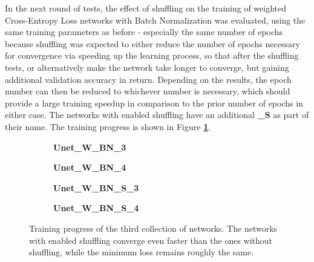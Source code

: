 In the next round of tests, the effect of shuffling on the training of weighted Cross-Entropy Loss networks with Batch Normalization was evaluated, using the same training parameters as before - especially the same number of epochs because shuffling was expected to either reduce the number of epochs necessary for convergence via speeding up the learning process, so that after the shuffling tests, or alternatively make the network take longer to converge, but gaining additional validation accuracy in return. Depending on the results, the epoch number can then be reduced to whichever number is necessary, which should provide a large training speedup in comparison to the prior number of epochs in either case. The networks with enabled shuffling have an additional \textbf{\_S} as part of their name. The training progress is shown in Figure \textbf{\ref{fig:weighted_batchnorm_shuffle_training}}.

\begin {figure}[!htb]
	\begin {subfigure}[b]{0.4\linewidth}
		\scalebox{0.65}{}
		\caption{\textbf{Unet\_W\_BN\_3}}
	\end {subfigure}\hspace{1.75cm}
	\begin {subfigure}[b]{0.4\linewidth}
		\scalebox{0.65}{}
		\caption{\textbf{Unet\_W\_BN\_4}}
	\end {subfigure}

	\begin {subfigure}[b]{0.4\linewidth}
		\scalebox{0.65}{}
		\caption{\textbf{Unet\_W\_BN\_S\_3}}
	\end {subfigure}\hspace{1.75cm}
	\begin {subfigure}[b]{0.4\linewidth}
		\scalebox{0.65}{}
		\caption{\textbf{Unet\_W\_BN\_S\_4}}
	\end {subfigure}

		\caption[Training progress of the third collection of networks.]{Training progress of the third collection of networks. The networks with enabled shuffling converge even faster than the ones without shuffling, while the minimum loss remains roughly the same.}
		\label{fig:weighted_batchnorm_shuffle_training}
\end {figure}


